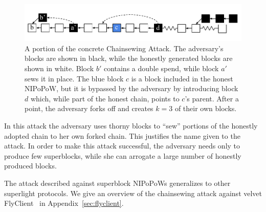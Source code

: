 \begin{figure}
	\begin{center}
		\includegraphics[width=0.99\columnwidth]{figures/chainsew-concrete.pdf}
	\end{center}
	\caption{A portion of the concrete Chainsewing Attack. The adversary's blocks are shown in black, while the honestly generated blocks are shown in white. Block $b'$ contains a double spend, while block $a'$ sews it in place. The blue block $c$ is a block included in the honest NIPoPoW, but it is bypassed by the adversary by introducing block $d$ which, while part of the honest chain, points to $c$'s parent. After a point, the adversary forks off and creates $k = 3$ of their own blocks.}
	\label{fig:attack}
\end{figure}

In this attack the adversary uses thorny blocks to ``sew'' portions of the
honestly adopted chain to her own forked chain. This justifies the name given to
the attack.
In order to make this attack successful, the adversary needs only to
produce few superblocks, while she can arrogate a large number of
honestly produced blocks.

The attack described against superblock NIPoPoWs generalizes to other superlight protocols.
We give an overview of the chainsewing attack against velvet FlyClient~\cite{flyclient} in
Appendix~\ref{sec:flyclient}.

